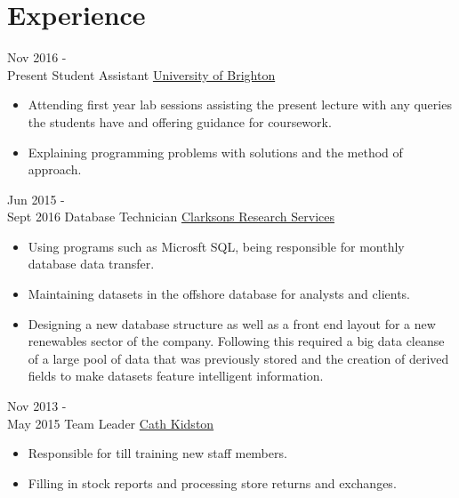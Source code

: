 \documentclass[letterpaper]{twentysecondcv} %
\begin{document}

\vspace{-1mm}
\section{Experience}
\vspace{-1mm}
\begin{twenty} %
	\twentyitem
    	{Nov 2016 - \\Present}
        {Student Assistant}
        {\href{https://www.brighton.ac.uk/index.aspx}{University of Brighton}}
        {}
        {
        {\begin{itemize}
        \item Attending first year lab sessions assisting the present lecture with any queries the students have and offering guidance for coursework.
        \item Explaining programming problems with solutions and the method of approach.
    \end{itemize}}
        }
        
    \twentyitem
   		{Jun 2015 - \\ Sept 2016}
        {Database Technician}
        {\href{http://www.clarksons.com/services/research/}{Clarksons Research Services}}
        {}
        {
        {\begin{itemize}
        \item Using programs such as Microsft SQL, being responsible for monthly database data transfer.
        \item Maintaining datasets in the offshore database for analysts and clients.
        \item Designing a new database structure as well as a front end layout for a new renewables sector of the company. Following this required a big data cleanse of a large pool of data that was previously stored and the creation of derived fields to make datasets feature intelligent information.
    \end{itemize}}
        }
        
     \twentyitem
   		{Nov 2013 - \\ May 2015}
        {Team Leader}
        {\href{http://www.cathkidston.com/}{Cath Kidston}}
        {}
        {
        \begin{itemize}
        \item Responsible for till training new staff members.
        \item Filling in stock reports and processing store returns and exchanges.
    \end{itemize}
    	}
        
\end{twenty}
\end{document}
